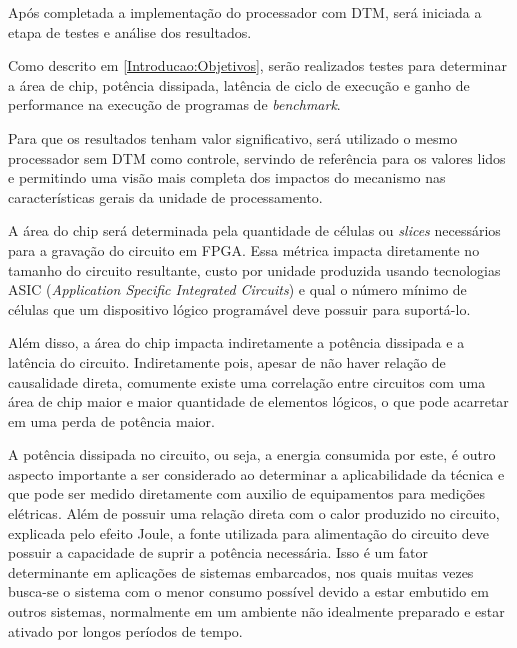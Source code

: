Após completada a implementação do processador com DTM, será iniciada a etapa de testes e análise dos resultados. 


Como descrito em \ref{Introducao:Objetivos}, serão realizados testes para determinar a área de chip, potência dissipada, latência de ciclo de execução e ganho de performance na execução de programas de \textit{benchmark}.

Para que os resultados tenham valor significativo, será utilizado o mesmo processador sem DTM como controle, servindo de referência para os valores lidos e permitindo uma visão mais completa dos impactos do mecanismo nas características gerais da unidade de processamento.


A área do chip será determinada pela quantidade de células ou \textit{slices} necessários para a gravação do circuito em FPGA. Essa métrica impacta diretamente no tamanho do circuito resultante, custo por unidade produzida usando tecnologias ASIC (\textit{Application Specific Integrated Circuits}) e qual o número mínimo de células que um dispositivo lógico programável deve possuir para suportá-lo. 

Além disso, a área do chip impacta indiretamente a potência dissipada e a latência do circuito. Indiretamente pois, apesar de não haver relação de causalidade direta, comumente existe uma correlação entre circuitos com uma área de chip maior e maior quantidade de elementos lógicos, o que pode acarretar em uma perda de potência maior.

A potência dissipada no circuito, ou seja, a energia consumida por este, é outro aspecto importante a ser considerado ao determinar a aplicabilidade da técnica e que pode ser medido diretamente com auxilio de equipamentos para medições elétricas. Além de possuir uma relação direta com o calor produzido no circuito, explicada pelo efeito Joule, a fonte utilizada para alimentação do circuito deve possuir a capacidade de suprir a potência necessária. Isso é um fator determinante em aplicações de sistemas embarcados, nos quais muitas vezes busca-se o sistema com o menor consumo possível devido a estar embutido em outros sistemas, normalmente em um ambiente não idealmente preparado e estar ativado por longos períodos de tempo.

